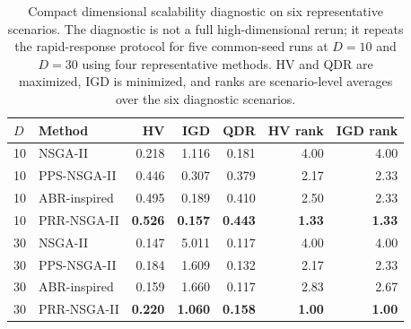 \begin{table}[htbp]
\centering
\caption{Compact dimensional scalability diagnostic on six representative scenarios. The diagnostic is not a full high-dimensional rerun; it repeats the rapid-response protocol for five common-seed runs at $D=10$ and $D=30$ using four representative methods. HV and QDR are maximized, IGD is minimized, and ranks are scenario-level averages over the six diagnostic scenarios.}
\label{tab:scalability-diagnostic}
\scriptsize
\setlength{\tabcolsep}{3pt}
\begin{tabular}{llrrrrr}
\toprule
$D$ & Method & HV & IGD & QDR & HV rank & IGD rank \\
\midrule
10 & NSGA-II & 0.218 & 1.116 & 0.181 & 4.00 & 4.00 \\
10 & PPS-NSGA-II & 0.446 & 0.307 & 0.379 & 2.17 & 2.33 \\
10 & ABR-inspired & 0.495 & 0.189 & 0.410 & 2.50 & 2.33 \\
10 & PRR-NSGA-II & \textbf{0.526} & \textbf{0.157} & \textbf{0.443} & \textbf{1.33} & \textbf{1.33} \\
\midrule
30 & NSGA-II & 0.147 & 5.011 & 0.117 & 4.00 & 4.00 \\
30 & PPS-NSGA-II & 0.184 & 1.609 & 0.132 & 2.17 & 2.33 \\
30 & ABR-inspired & 0.159 & 1.660 & 0.117 & 2.83 & 2.67 \\
30 & PRR-NSGA-II & \textbf{0.220} & \textbf{1.060} & \textbf{0.158} & \textbf{1.00} & \textbf{1.00} \\
\bottomrule
\end{tabular}
\end{table}